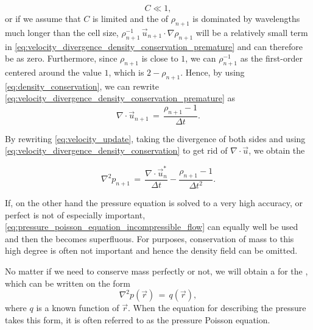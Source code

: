%
\begin{equation}
C \ll 1,
\end{equation}
%
or if we assume that $C$ is limited and the \spectrum of $\rho_{n+1}$ is dominated by wavelengths much longer than the cell size, $\rho_{n+1}^{-1}\,\vec{u}_{n+1}\cdot\nabla\rho_{n+1}$ will be a relatively small term in \eqref{eq:velocity_divergence_density_conservation_premature} and can therefore be \approximated as zero. Furthermore, since $\rho_{n+1}$ is close to $1$, we can \approximate $\rho_{n+1}^{-1}$ as the first-order  centered around the value $1$, which is $2-\rho_{n+1}$. Hence, by using \eqref{eq:density_conservation}, we can rewrite \eqref{eq:velocity_divergence_density_conservation_premature} as
%
\begin{equation} \label{eq:velocity_divergence_density_conservation}
\nabla\cdot\vec{u}_{n+1} \,=\, \frac{\rho_{n+1}-1}{\Delta t}.
\end{equation}

By rewriting \eqref{eq:velocity_update}, taking the divergence of both sides and using \eqref{eq:velocity_divergence_density_conservation} to get rid of $\nabla\cdot\vec{u}$, we obtain the 

\begin{equation} \label{eq:pressure_poisson_equation_density_conservation}
\nabla^2 p_{n+1} \,=\, \frac{\nabla\cdot\vec{u}^*_n}{\Delta t} - \frac{\rho_{n+1} - 1}{\Delta t^2}.
\end{equation}

If, on the other hand the pressure equation is solved to a very high accuracy, or perfect  is not of especially important, \eqref{eq:pressure_poisson_equation_incompressible_flow} can equally well be used and then the  becomes superfluous. For \simulation purposes, conservation of mass to this high degree is often not important and hence the density field can be omitted.

No matter if we need to conserve mass perfectly or not, we will obtain a  for the , which can be written on the form
%
\begin{equation} \label{eq:pressure_poisson_equation_continuous}
\nabla^2 p(\vec{r}) \,=\, q(\vec{r}),
\end{equation}
%
where $q$ is a known function of $\vec{r}$. When the equation for describing the pressure takes this form, it is often referred to as the pressure Poisson equation.

